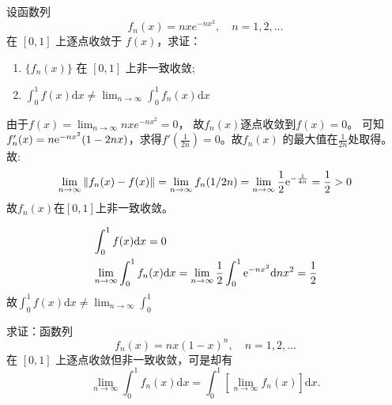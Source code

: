 \begin{problem}
    设函数列\[
        f_n(x) = nx e^{-nx^2} , \quad n = 1, 2, \dots
    \]
    在 \([0, 1]\) 上逐点收敛于 \(f(x)\)，求证：
    \begin{enumerate}
        \item \(\{f_n(x)\}\) 在 \([0, 1]\) 上非一致收敛;
        \item \(\int_{0}^{1} f(x) \mathrm{d}x \neq \lim_{n \to \infty}
            \int_{0}^{1} f_n(x) \mathrm{d}x\)
    \end{enumerate}
\end{problem}

\begin{solution}
    由于\(f(x) = \lim_{n \to \infty} nx e^{-nx^2} = 0\)，
    故\(f_{n}(x)\)逐点收敛到\(f(x) = 0\)。
    可知\(f_{n}'(x) = n \mathrm{e}^{-nx^{2}}(1-2nx)\)，求得\(f'\left(
    \frac{1}{2n} \right) = 0\)。故\(f_{n}(x)\)
    的最大值在\(\frac{1}{2n}\)处取得。
    故:
    \[
        \lim_{n \to \infty} \left\lVert f_{n}(x) - f(x) \right\rVert
        = \lim_{n \to \infty} f_{n}(1/2n) = \lim_{n \to \infty}
        \frac{1}{2} \mathrm{e}^{-\frac{1}{4n}} = \frac{1}{2} >  0
    \]
    故\(f_{n}(x)\)在\([0,1]\)上非一致收敛。

    \begin{align*}
        & \int_{0}^{1} f(x) \mathrm{d}x = 0                       \\
        & \lim_{n \to \infty} \int_{0}^{1} f_{n}(x) \mathrm{d}x =
        \lim_{n \to \infty} \frac{1}{2}\int_{0}^{1}
        \mathrm{e}^{-nx^{2}} \mathrm{d}nx^{2} = \frac{1}{2}
    \end{align*}
    故\(\int_{0}^{1} f(x) \mathrm{d}x \neq \lim_{n \to
    \infty} \int_{0}^{1}\)

\end{solution}

\begin{problem}
    求证：函数列
    \[
        f_n(x) = nx(1-x)^n, \quad n = 1, 2, \dots
    \]
    在 \([0, 1]\) 上逐点收敛但非一致收敛，可是却有
    \[
        \lim_{n \to \infty} \int_0^1 f_n(x) \mathrm{d}x =
        \int_0^1 \left[
        \lim_{n \to \infty} f_n(x) \right] \mathrm{d}x.
    \]
\end{problem}

